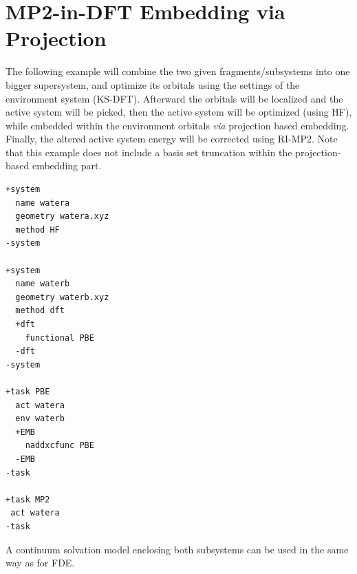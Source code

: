 \documentclass[bibliography=totocnumbered,a4paper,10pt,oneside]{scrbook}
\begin{document}
\section{MP2-in-DFT Embedding via Projection}
The following example will combine the two given fragments/subsystems into one bigger supersystem, and optimize its orbitals using
the settings of the environment system (KS-DFT). Afterward the orbitals will be localized and the active system will be picked,
then the active system will be optimized (using HF), while embedded within the environment orbitals \textit{via} projection based embedding.
Finally, the altered active system energy will be corrected using RI-MP2. Note that this example does not include a basis set truncation within
the projection-based embedding part.
\begin{lstlisting}
+system
  name watera
  geometry watera.xyz
  method HF
-system

+system
  name waterb
  geometry waterb.xyz
  method dft
  +dft
    functional PBE
  -dft
-system

+task PBE
  act watera
  env waterb
  +EMB
    naddxcfunc PBE
  -EMB
-task

+task MP2
 act watera
-task

\end{lstlisting}
A continuum solvation model enclosing both subsystems can be used in the same way as for
FDE.
\end{document}
